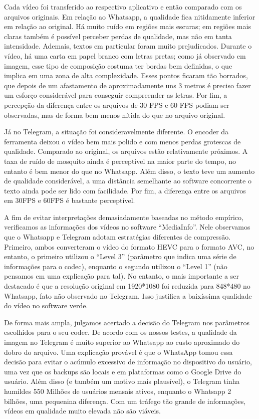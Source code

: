 \paragrafo Cada vídeo foi transferido ao respectivo aplicativo e então comparado com os arquivos originais. Em relação ao Whatsapp, a qualidade fica nitidamente inferior em relação ao original. Há muito ruído em regiões mais escuras; em regiões mais claras também é possível perceber perdas de qualidade, mas não em tanta intensidade. Ademais, textos em particular foram muito prejudicados. Durante o vídeo, há uma carta em papel branco com letras pretas; como já observado em imagem, esse tipo de composição costuma ter bordas bem definidas, o que implica em uma zona de alta complexidade. Esses pontos ficaram tão borrados, que depois de um afastamento de aproximadamente uns 3 metros é preciso fazer um esforço considerável para conseguir compreender as letras. Por fim, a percepção da diferença entre os arquivos de 30 FPS e 60 FPS podiam ser observadas, mas de forma bem menos nítida do que no arquivo original.

\paragrafo Já no Telegram, a situação foi consideravelmente diferente. O encoder da ferramenta deixou o vídeo bem mais polido e com menos perdas grotescas de qualidade. Comparado ao original, os arquivos estão relativamente próximos. A taxa de ruído de mosquito ainda é perceptível na maior parte do tempo, no entanto é bem menor do que no Whatsapp. Além disso, o texto teve um aumento de qualidade considerável, a uma distância semelhante ao software concorrente o texto ainda pode ser lido com facilidade. Por fim, a diferença entre os arquivos em 30FPS e 60FPS é bastante perceptível.

\paragrafo A fim de evitar interpretações demasiadamente baseadas no método empírico, verificamos as informações dos vídeos no software “MediaInfo”. Nele observamos que o Whatsapp e Telegram adotam estratégias diferentes de compressão. Primeiro, ambos converteram o vídeo do formato HEVC para o formato AVC, no entanto, o primeiro utilizou o “Level 3” (parâmetro que indica uma série de informações para o codec), enquanto o segundo utilizou o “Level 1” (não pensamos em uma explicação para tal). No entanto, o mais importante a ser destacado é que a resolução original em 1920*1080 foi reduzida para 848*480 no Whatsapp, fato não observado no Telegram. Isso justifica a baixíssima qualidade do vídeo no software verde.

\paragrafo De forma mais ampla, julgamos acertado a decisão do Telegram nos parâmetros escolhidos para o seu codec. De acordo com os nossos testes, a qualidade da imagem no Telegram é muito superior ao Whatsapp ao custo aproximado do dobro do arquivo. Uma explicação provável é que o  WhatsApp tomou essa decisão para evitar o acúmulo excessivo de informação no dispositivo do usuário, uma vez que os backups são locais e em plataformas como o Google Drive do usuário. Além disso (e também um motivo mais plausível), o Telegram tinha humildes 550 Milhões de usuários mensais ativos, enquanto o Whatsapp 2 bilhões, uma pequenina diferença. Com um tráfego tão grande de informações, vídeos em qualidade muito elevada não são viáveis.
